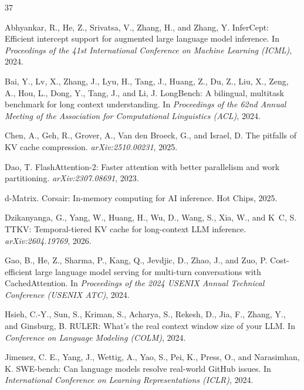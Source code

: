 \documentclass{article}
\begin{document}
\begin{thebibliography}{37}

Abhyankar, R., He, Z., Srivatsa, V., Zhang, H., and Zhang, Y.
\newblock InferCept: Efficient intercept support for augmented large
  language model inference.
\newblock In \emph{Proceedings of the 41st International Conference on
  Machine Learning (ICML)}, 2024.

Bai, Y., Lv, X., Zhang, J., Lyu, H., Tang, J., Huang, Z., Du, Z.,
  Liu, X., Zeng, A., Hou, L., Dong, Y., Tang, J., and Li, J.
\newblock LongBench: A bilingual, multitask benchmark for long context
  understanding.
\newblock In \emph{Proceedings of the 62nd Annual Meeting of the
  Association for Computational Linguistics (ACL)}, 2024.

Chen, A., Geh, R., Grover, A., Van den Broeck, G., and Israel, D.
\newblock The pitfalls of KV cache compression.
\newblock \emph{arXiv:2510.00231}, 2025.

Dao, T.
\newblock FlashAttention-2: Faster attention with better parallelism and
  work partitioning.
\newblock \emph{arXiv:2307.08691}, 2023.

d-Matrix.
\newblock Corsair: In-memory computing for AI inference.
\newblock Hot Chips, 2025.

Dzikanyanga, G., Yang, W., Huang, H., Wu, D., Wang, S., Xia, W., and
  K~C, S.
\newblock TTKV: Temporal-tiered KV cache for long-context LLM inference.
\newblock \emph{arXiv:2604.19769}, 2026.

Gao, B., He, Z., Sharma, P., Kang, Q., Jevdjic, D., Zhao, J., and
  Zuo, P.
\newblock Cost-efficient large language model serving for multi-turn
  conversations with CachedAttention.
\newblock In \emph{Proceedings of the 2024 USENIX Annual Technical
  Conference (USENIX ATC)}, 2024.

Hsieh, C.-Y., Sun, S., Kriman, S., Acharya, S., Rekesh, D., Jia, F.,
  Zhang, Y., and Ginsburg, B.
\newblock RULER: What's the real context window size of your LLM.
\newblock In \emph{Conference on Language Modeling (COLM)}, 2024.

Jimenez, C. E., Yang, J., Wettig, A., Yao, S., Pei, K., Press, O.,
  and Narasimhan, K.
\newblock SWE-bench: Can language models resolve real-world GitHub
  issues.
\newblock In \emph{International Conference on Learning
  Representations (ICLR)}, 2024.


\end{thebibliography}
\end{document}

